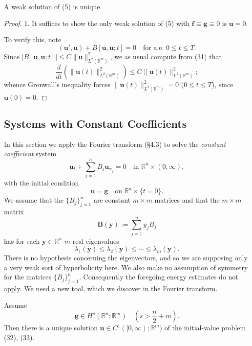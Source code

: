 \begin{theorem}
\label{thm:symmetric-hyperbolic-uniqueness-weak-solution}
A weak solution of (5) is unique.
\end{theorem}

\begin{proof}
1. It suffices to show the only weak solution of (5) with $\mathbf{f} \equiv \mathbf{g} \equiv 0$ is $\mathbf{u} = 0$.

To verify this, note
\[
(\mathbf{u}', \mathbf{u}) + B[\mathbf{u}, \mathbf{u}; t] = 0 \quad \text{for a.e. } 0 \le t \le T.
\tag{31}
\]
Since $|B[\mathbf{u}, \mathbf{u}; t]| \le C\|\mathbf{u}\|_{L^2(\mathbb{R}^m)}^2$, we as usual compute from (31) that
\[
\frac{d}{dt}\left(\|\mathbf{u}(t)\|_{L^2(\mathbb{R}^m)}^2\right) \le C\|\mathbf{u}(t)\|_{L^2(\mathbb{R}^m)}^2;
\]
whence Gronwall's inequality forces $\|\mathbf{u}(t)\|_{L^2(\mathbb{R}^m)}^2 = 0$ ($0 \le t \le T$), since $\mathbf{u}(0) = 0$.
\end{proof}

\subsection{Systems with Constant Coefficients}

In this section we apply the Fourier transform (\S4.3) to solve the \textit{constant coefficient} system
\[
\mathbf{u}_t + \sum_{j=1}^n B_j \mathbf{u}_{x_j} = 0 \quad \text{in } \mathbb{R}^n \times (0,\infty),
\tag{32}
\]
with the initial condition
\[
\mathbf{u} = \mathbf{g} \quad \text{on } \mathbb{R}^n \times \{t = 0\}.
\tag{33}
\]
We assume that the $\{B_j\}_{j=1}^n$ are constant $m \times m$ matrices and that the $m \times m$ matrix
\[
\mathbf{B}(\mathbf{y}) := \sum_{j=1}^n y_j B_j
\tag{34}
\]
has for each $\mathbf{y} \in \mathbb{R}^n$ $m$ real eigenvalues
\[
\lambda_1(\mathbf{y}) \le \lambda_2(\mathbf{y}) \le \cdots \le \lambda_m(\mathbf{y}).
\tag{35}
\]
There is no hypothesis concerning the eigenvectors, and so we are supposing only a very weak sort of hyperbolicity here. We also make no assumption of symmetry for the matrices $\{B_j\}_{j=1}^n$. Consequently the foregoing energy estimates do not apply. We need a new tool, which we discover in the Fourier transform.

\begin{theorem}
\label{thm:constant-coefficient-hyperbolic-existence}
Assume
\[
\mathbf{g} \in H^s(\mathbb{R}^n; \mathbb{R}^m) \quad \left(s > \frac{n}{2} + m\right).
\]
Then there is a unique solution $\mathbf{u} \in C^1([0, \infty); \mathbb{R}^m)$ of the initial-value problem (32), (33).
\end{theorem}


